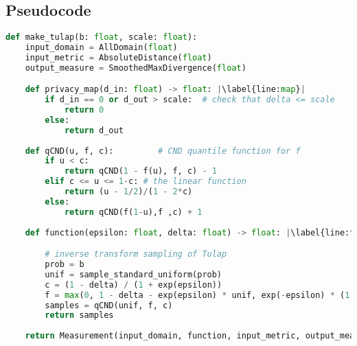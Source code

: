 \documentclass{article}
\begin{document}
\subsection*{Pseudocode}


            
    
    
        

\begin{lstlisting}[language=Python, escapechar=|]
def make_tulap(b: float, scale: float):
    input_domain = AllDomain(float)
    input_metric = AbsoluteDistance(float)
    output_measure = SmoothedMaxDivergence(float)

    def privacy_map(d_in: float) -> float: |\label{line:map}|
        if d_in == 0 or d_out > scale:  # check that delta <= scale
            return 0
        else: 
            return d_out
            
    def qCND(u, f, c):         # CND quantile function for f
        if u < c:
            return qCND(1 - f(u), f, c) - 1
        elif c <= u <= 1-c: # the linear function 
            return (u - 1/2)/(1 - 2*c)
        else:
            return qCND(f(1-u),f ,c) + 1  
            
    def function(epsilon: float, delta: float) -> float: |\label{line:fn}|

        # inverse transform sampling of Tulap
        prob = b
        unif = sample_standard_uniform(prob)
        c = (1 - delta) / (1 + exp(epsilon))
        f = max(0, 1 - delta - exp(epsilon) * unif, exp(-epsilon) * (1 - delta - unif))
        samples = qCND(unif, f, c)
        return samples
        
    return Measurement(input_domain, function, input_metric, output_measure, privacy_map)
\end{lstlisting}
\end{document}
